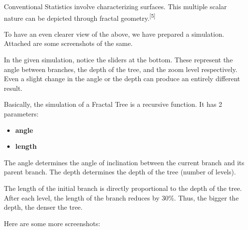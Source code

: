 \documentclass{resonance}
\begin{document}
Conventional Statistics involve characterizing surfaces. This multiple scalar nature can be depicted through fractal geometry.\textsuperscript{[5]}

To have an even clearer view of the above, we have prepared a simulation. Attached are some screenshots of the same.

In the given simulation, notice the sliders at the bottom. These represent the angle between branches, the depth of the tree, and the zoom level respectively. Even a slight change in the angle or the depth can produce an entirely different result.

Basically, the simulation of a Fractal Tree is a recursive function. It has 2 parameters:
\begin{itemize}
    \item \textbf{angle}
    \item \textbf{length}
\end{itemize}

The angle determines the angle of inclination between the current branch and its parent branch. The depth determines the depth of the tree (number of levels).

The length of the initial branch is directly proportional to the depth of the tree. After each level, the length of the branch reduces by 30\%. Thus, the bigger the depth, the denser the tree.

Here are some more screenshots:\\

\begin{figure}[h]
\hskip 3.27cm
\vspace{40pt}
\end{figure}
\end{document}
